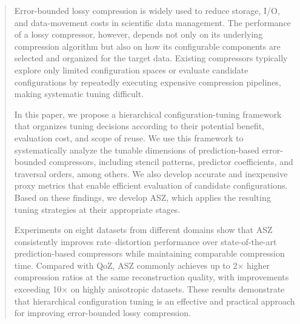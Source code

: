 
\begin{abstract}
Error-bounded lossy compression is widely used to reduce storage, I/O, and data-movement costs in scientific data management. The performance of a lossy compressor, however, depends not only on its underlying compression algorithm but also on how its configurable components are selected and organized for the target data. Existing compressors typically explore only limited configuration spaces or evaluate candidate configurations by repeatedly executing expensive compression pipelines, making systematic tuning difficult.

In this paper, we propose a hierarchical configuration-tuning framework that organizes tuning decisions according to their potential benefit, evaluation cost, and scope of reuse. We use this framework to systematically analyze the tunable dimensions of prediction-based error-bounded compressors, including stencil patterns, predictor coefficients, and traversal orders, among others. We also develop accurate and inexpensive proxy metrics that enable efficient evaluation of candidate configurations. Based on these findings, we develop ASZ, which applies the resulting tuning strategies at their appropriate stages.

Experiments on eight datasets from different domains show that ASZ consistently improves rate–distortion performance over state-of-the-art prediction-based compressors while maintaining comparable compression time. Compared with QoZ, ASZ commonly achieves up to 2× higher compression ratios at the same reconstruction quality, with improvements exceeding 10× on highly anisotropic datasets. These results demonstrate that hierarchical configuration tuning is an effective and practical approach for improving error-bounded lossy compression.
\end{abstract}